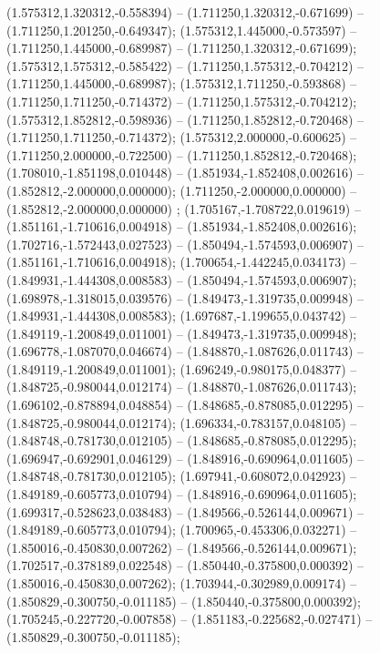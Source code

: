  (1.575312,1.320312,-0.558394) -- (1.711250,1.320312,-0.671699) -- (1.711250,1.201250,-0.649347);
 (1.575312,1.445000,-0.573597) -- (1.711250,1.445000,-0.689987) -- (1.711250,1.320312,-0.671699);
 (1.575312,1.575312,-0.585422) -- (1.711250,1.575312,-0.704212) -- (1.711250,1.445000,-0.689987);
 (1.575312,1.711250,-0.593868) -- (1.711250,1.711250,-0.714372) -- (1.711250,1.575312,-0.704212);
 (1.575312,1.852812,-0.598936) -- (1.711250,1.852812,-0.720468) -- (1.711250,1.711250,-0.714372);
 (1.575312,2.000000,-0.600625) -- (1.711250,2.000000,-0.722500) -- (1.711250,1.852812,-0.720468);
 (1.708010,-1.851198,0.010448) -- (1.851934,-1.852408,0.002616) -- (1.852812,-2.000000,0.000000);
 (1.711250,-2.000000,0.000000) -- (1.852812,-2.000000,0.000000) ;
 (1.705167,-1.708722,0.019619) -- (1.851161,-1.710616,0.004918) -- (1.851934,-1.852408,0.002616);
 (1.702716,-1.572443,0.027523) -- (1.850494,-1.574593,0.006907) -- (1.851161,-1.710616,0.004918);
 (1.700654,-1.442245,0.034173) -- (1.849931,-1.444308,0.008583) -- (1.850494,-1.574593,0.006907);
 (1.698978,-1.318015,0.039576) -- (1.849473,-1.319735,0.009948) -- (1.849931,-1.444308,0.008583);
 (1.697687,-1.199655,0.043742) -- (1.849119,-1.200849,0.011001) -- (1.849473,-1.319735,0.009948);
 (1.696778,-1.087070,0.046674) -- (1.848870,-1.087626,0.011743) -- (1.849119,-1.200849,0.011001);
 (1.696249,-0.980175,0.048377) -- (1.848725,-0.980044,0.012174) -- (1.848870,-1.087626,0.011743);
 (1.696102,-0.878894,0.048854) -- (1.848685,-0.878085,0.012295) -- (1.848725,-0.980044,0.012174);
 (1.696334,-0.783157,0.048105) -- (1.848748,-0.781730,0.012105) -- (1.848685,-0.878085,0.012295);
 (1.696947,-0.692901,0.046129) -- (1.848916,-0.690964,0.011605) -- (1.848748,-0.781730,0.012105);
 (1.697941,-0.608072,0.042923) -- (1.849189,-0.605773,0.010794) -- (1.848916,-0.690964,0.011605);
 (1.699317,-0.528623,0.038483) -- (1.849566,-0.526144,0.009671) -- (1.849189,-0.605773,0.010794);
 (1.700965,-0.453306,0.032271) -- (1.850016,-0.450830,0.007262) -- (1.849566,-0.526144,0.009671);
 (1.702517,-0.378189,0.022548) -- (1.850440,-0.375800,0.000392) -- (1.850016,-0.450830,0.007262);
 (1.703944,-0.302989,0.009174) -- (1.850829,-0.300750,-0.011185) -- (1.850440,-0.375800,0.000392);
 (1.705245,-0.227720,-0.007858) -- (1.851183,-0.225682,-0.027471) -- (1.850829,-0.300750,-0.011185);
